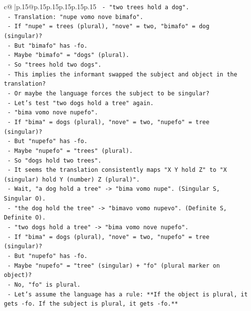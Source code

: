 \documentclass{article}
\begin{document}
{\begin{supertabular}{c@{$\;$}|p{.15\linewidth}@{}p{.15\linewidth}p{.15\linewidth}p{.15\linewidth}p{.15\linewidth}p{.15\linewidth}}
{{{\texttt{           {-} "two trees hold a dog".} \\
\texttt{           {-} Translation: "nupe vomo nove bimafo".} \\
\texttt{           {-} If "nupe" = trees (plural), "nove" = two, "bimafo" = dog (singular)?} \\
\texttt{           {-} But "bimafo" has {-}fo.} \\
\texttt{           {-} Maybe "bimafo" = "dogs" (plural).} \\
\texttt{           {-} So "trees hold two dogs".} \\
\texttt{           {-} This implies the informant swapped the subject and object in the translation?} \\
\texttt{           {-} Or maybe the language forces the subject to be singular?} \\
\texttt{           {-} Let's test "two dogs hold a tree" again.} \\
\texttt{           {-} "bima vomo nove nupefo".} \\
\texttt{           {-} If "bima" = dogs (plural), "nove" = two, "nupefo" = tree (singular)?} \\
\texttt{           {-} But "nupefo" has {-}fo.} \\
\texttt{           {-} Maybe "nupefo" = "trees" (plural).} \\
\texttt{           {-} So "dogs hold two trees".} \\
\texttt{           {-} It seems the translation consistently maps "X Y hold Z" to "X (singular) hold Y (number) Z (plural)".} \\
\texttt{           {-} Wait, "a dog hold a tree" {-}> "bima vomo nupe". (Singular S, Singular O).} \\
\texttt{           {-} "the dog hold the tree" {-}> "bimavo vomo nupevo". (Definite S, Definite O).} \\
\texttt{           {-} "two dogs hold a tree" {-}> "bima vomo nove nupefo".} \\
\texttt{             {-} If "bima" = dogs (plural), "nove" = two, "nupefo" = tree (singular)?} \\
\texttt{             {-} But "nupefo" has {-}fo.} \\
\texttt{             {-} Maybe "nupefo" = "tree" (singular) + "fo" (plural marker on object)?} \\
\texttt{             {-} No, "fo" is plural.} \\
\texttt{             {-} Let's assume the language has a rule: **If the object is plural, it gets {-}fo. If the subject is plural, it gets {-}fo.**} \\
}}}
\end{supertabular}}
\end{document}
